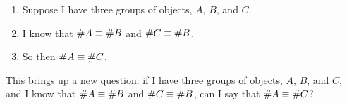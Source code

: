 \begin{enumerate}
    \item Suppose I have three groups of objects, $A$, $B$, and $C$.
    \item I know that $\# A \equiv \# B$ and $\# C \equiv \# B$.
    \item So then $\# A \equiv \# C$.
\end{enumerate}

This brings up a new question: if I have three groups of objects, $A$, $B$, and $C$, and I know that $\# A \equiv \# B$ and $\# C \equiv \# B$, can I say that $\# A \equiv \# C$?
